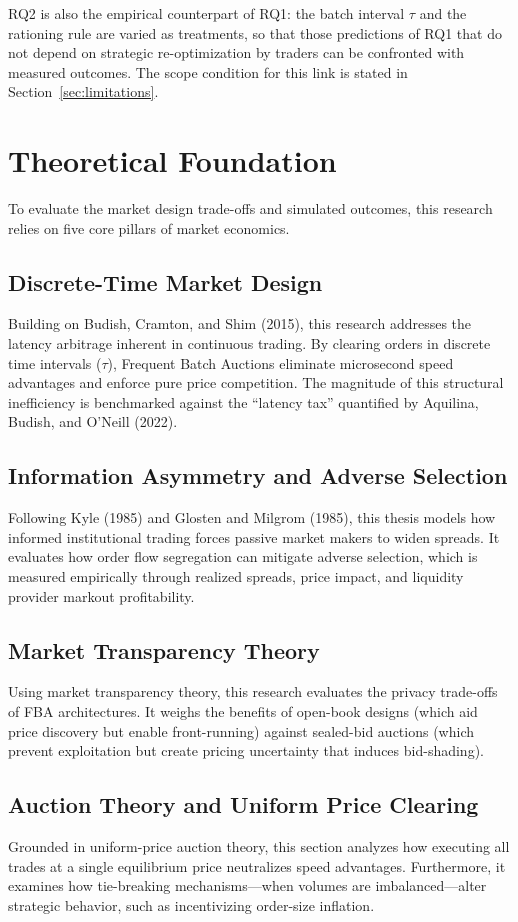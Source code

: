 \documentclass[11pt]{article}
\begin{document}
RQ2 is also the empirical counterpart of RQ1: the batch interval $\tau$ and the rationing rule are varied as treatments, so that those predictions of RQ1 that do not depend on strategic re-optimization by traders can be confronted with measured outcomes. The scope condition for this link is stated in Section~\ref{sec:limitations}.



\section{Theoretical Foundation}
To evaluate the market design trade-offs and simulated outcomes, this research relies on five core pillars of market economics.

\subsection{Discrete-Time Market Design}
Building on Budish, Cramton, and Shim (2015), this research addresses the latency arbitrage inherent in continuous trading. By clearing orders in discrete time intervals ($\tau$), Frequent Batch Auctions eliminate microsecond speed advantages and enforce pure price competition. The magnitude of this structural inefficiency is benchmarked against the ``latency tax'' quantified by Aquilina, Budish, and O'Neill (2022).

\subsection{Information Asymmetry and Adverse Selection}
Following Kyle (1985) and Glosten and Milgrom (1985), this thesis models how informed institutional trading forces passive market makers to widen spreads. It evaluates how order flow segregation can mitigate adverse selection, which is measured empirically through realized spreads, price impact, and liquidity provider markout profitability.

\subsection{Market Transparency Theory}
Using market transparency theory, this research evaluates the privacy trade-offs of FBA architectures. It weighs the benefits of open-book designs (which aid price discovery but enable front-running) against sealed-bid auctions (which prevent exploitation but create pricing uncertainty that induces bid-shading).

\subsection{Auction Theory and Uniform Price Clearing}
Grounded in uniform-price auction theory, this section analyzes how executing all trades at a single equilibrium price neutralizes speed advantages. Furthermore, it examines how tie-breaking mechanisms—when volumes are imbalanced—alter strategic behavior, such as incentivizing order-size inflation.
\end{document}
